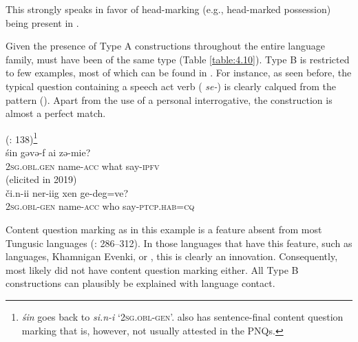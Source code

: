 \documentclass[output=paper,colorlinks,citecolor=brown]{langscibook}
\begin{document}
\noindent This strongly speaks in favor of head-marking (e.g., head-marked possession) being present in .

Given the presence of Type A constructions throughout the entire language family,  must have been of the same type (Table \ref{table:4.10}). Type B is restricted to few examples, most of which can be found in . For instance, as seen before, the typical  question containing a speech act verb ( \textit{se-}) is clearly calqued from the  pattern (). Apart from the use of a personal interrogative, the construction is almost a perfect match.

\ea
    \label{example4.124}
     (\citealt{Zikmundová2013a}: 138)\footnote{ \textit{śin} goes back to \textit{si.n-i} ‘2\textsc{sg.obl-gen}’.  also has sentence-final content question marking that is, however, not usually attested in the PNQs.}\\
    \gll śin			gəvə-f		ai		zə-mie?\\
    2\textsc{sg.obl.gen}	name-\textsc{acc}		what		say-\textsc{ipfv}\\
\ex
    \label{example4.125}
     (elicited in  2019)\\
    \gll či.n-ii		ner-iig		xen		ge-deg=ve?\\
    2\textsc{sg.obl-gen}	name-\textsc{acc}		who		say-\textsc{ptcp.hab=cq}\\
    \z

\noindent Content question marking as in this  example is a feature absent from most Tungusic languages (\citealt{Hölzl2018a}: 286–312). In those languages that have this feature, such as  languages, Khamnigan Evenki, or , this is clearly an innovation. Consequently,  most likely did not have content question marking either. All Type B constructions can plausibly be explained with language contact.
\end{document}
